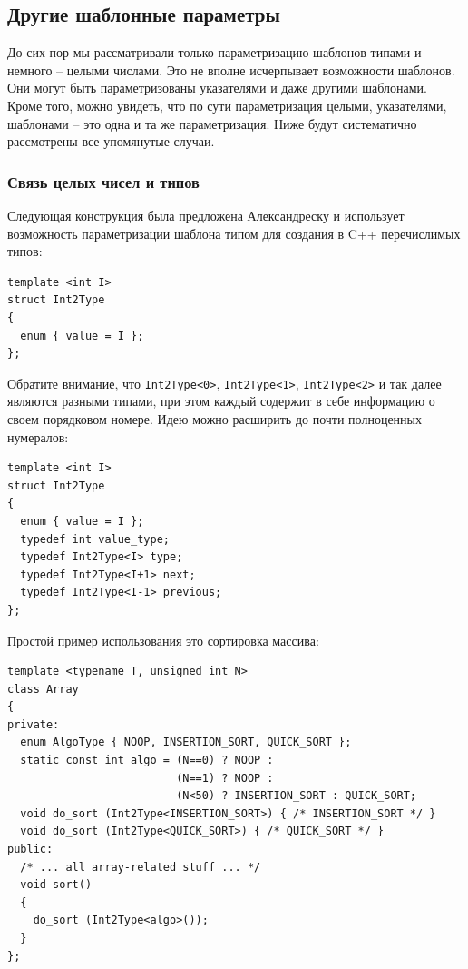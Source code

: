 \documentclass[a4paper,12pt,oneside]{article}
\begin{document}
\subsection{Другие шаблонные параметры}

До сих пор мы рассматривали только параметризацию шаблонов типами и немного -- целыми числами. Это не вполне исчерпывает возможности шаблонов. Они могут быть параметризованы указателями и даже другими шаблонами. Кроме того, можно увидеть, что по сути параметризация целыми, указателями, шаблонами -- это одна и та же параметризация. Ниже будут систематично рассмотрены все упомянутые случаи.

\subsubsection{Связь целых чисел и типов}\label{IntToype}

Следующая конструкция была предложена Александреску и использует возможность параметризации шаблона типом для создания в C++ перечислимых типов:

\begin{lstlisting}
template <int I>
struct Int2Type
{
  enum { value = I };
};
\end{lstlisting}

Обратите внимание, что \lstinline!Int2Type<0>!, \lstinline!Int2Type<1>!, \lstinline!Int2Type<2>! и так далее являются разными типами, при этом каждый содержит в себе информацию о своем порядковом номере. Идею можно расширить до почти полноценных нумералов:

\begin{lstlisting}
template <int I>
struct Int2Type
{
  enum { value = I };
  typedef int value_type;
  typedef Int2Type<I> type;
  typedef Int2Type<I+1> next;
  typedef Int2Type<I-1> previous;
};
\end{lstlisting}

Простой пример использования это сортировка массива:

\begin{lstlisting}
template <typename T, unsigned int N>
class Array 
{
private:
  enum AlgoType { NOOP, INSERTION_SORT, QUICK_SORT };
  static const int algo = (N==0) ? NOOP : 
                          (N==1) ? NOOP :
                          (N<50) ? INSERTION_SORT : QUICK_SORT;
  void do_sort (Int2Type<INSERTION_SORT>) { /* INSERTION_SORT */ }
  void do_sort (Int2Type<QUICK_SORT>) { /* QUICK_SORT */ }
public:
  /* ... all array-related stuff ... */
  void sort()
  {
    do_sort (Int2Type<algo>());
  }
};
\end{lstlisting}
\end{document}

